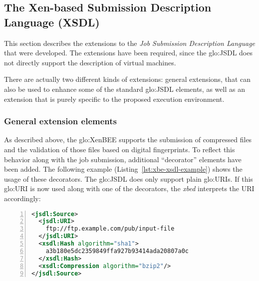 \subsection[The Xen-based Submission Description Language]{The Xen-based Submission Description Language (XSDL)}
\label{sec:xen-based-submission}

This  section  describes  the   extensions  to  the  \emph{Job  Submission
  Description  Language} that  were developed.   The extensions  have been
required,  since   the  \gls{glo:JSDL}  does  not   directly  support  the
description of virtual machines.

There are actually two  different kinds of extensions: general extensions,
that  can also  be used  to enhance  some of  the  standard \gls{glo:JSDL}
elements, as well as an extension  that is purely specific to the proposed
execution environment.

\subsubsection{General extension elements}

As  described  above,  the  \gls{glo:XenBEE} supports  the  submission  of
compressed  files and  the  validation  of those  files  based on  digital
fingerprints.   To reflect this  behavior along  with the  job submission,
additional ``decorator'' elements have  been added.  The following example
(Listing~\ref{lst:xbe-xsdl-example}) shows the  usage of these decorators.
The  \gls{glo:JSDL}  does  only  support plain  \gls{glo:URI}s.   If  this
\gls{glo:URI}  is  now  used  along   with  one  of  the  decorators,  the
\emph{xbed} interprets the URI accordingly:

\bigskip

\begin{center}
  \begin{minipage}{.75\textwidth}
    \begin{lstlisting}[captionpos=b,backgroundcolor=\color{listingcolor},frame=lines,numbers=left,numberstyle=\tiny,caption={Example
        with the general \texttt{Hash} and \texttt{Compression}
        extensions.},label={lst:xbe-xsdl-example-hash},language=XML]
<jsdl:Source>
  <jsdl:URI>
    ftp://ftp.example.com/pub/input-file
  </jsdl:URI>
  <xsdl:Hash algorithm="sha1">
    a3b180e5dc2359849ffa927b93414ada20807a0c
  </xsdl:Hash>
  <xsdl:Compression algorithm="bzip2"/>
</jsdl:Source>
    \end{lstlisting}
  \end{minipage}
\end{center}

